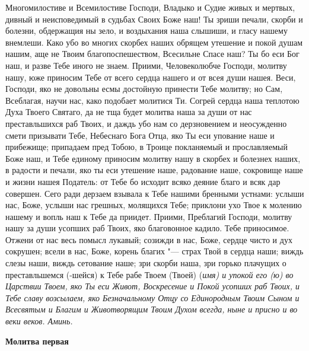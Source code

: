 Многомилостиве и Всемилостиве Господи, Владыко и Судие живых и мертвых, дивный и неисповедимый в судьбах Своих Боже наш! Ты зриши печали, скорби и болезни, обдержащия ны зело, и воздыхания наша слышиши, и гласу нашему внемлеши. Како убо во многих скорбех наших обрящем утешение и покой душам нашим, аще не Твоим благопоспешеством, Всесильне Спасе наш? Ты бо еси Бог наш, и разве Тебе иного не знаем. Приими, Человеколюбче Господи, молитву нашу, юже приносим Тебе от всего сердца нашего и от всея души нашея. Веси, Господи, яко не довольны есмы достойную принести Тебе молитву; но Сам, Всеблагая, научи нас, како подобает молитися Ти. Согрей сердца наша теплотою Духа Твоего Святаго, да не тща будет молитва наша за души от нас преставльшихся раб Твоих, и даждь убо нам со дерзновением и неосужденно смети призывати Тебе, Небеснаго Бога Отца, яко Ты еси упование наше и прибежище; припадаем пред Тобою, в Троице покланяемый и прославляемый Боже наш, и Тебе единому приносим молитву нашу в скорбех и болезнех наших, в радости и печали, яко ты еси утешение наше, радование наше, сокровище наше и жизни нашея Податель: от Тебе бо исходит всяко деяние благо и всяк дар совершен. Сего ради дерзаем взывала к Тебе нашими бренными устнами: услыши нас, Боже, услыши нас грешных, молящихся Тебе; приклони ухо Твое к молению нашему и вопль наш к Тебе да приидет. Приими, Преблагий Господи, молитву нашу за души усопших раб Твоих, яко благовонное кадило. Тебе приносимое. Отжени от нас весь помысл лукавый; созижди в нас, Боже, сердце чисто и дух сокрушен; всели в нас, Боже, корень благих "--- страх Твой в сердца наши; виждь слезы наши, виждь сетование наше; зри скорби наша, зри горько плачущих о преставльшемся (-шейся) к Тебе рабе Твоем (Твоей) (\itshape имя\normalfont{}) и упокой его (ю) во Царствии Твоем, яко Ты еси Живот, Воскресение и Покой усопших раб Твоих, и Тебе славу возсылаем, яко Безначальному Отцу со Единородным Твоим Сыном и Всесвятым и Благим и Животворящим Твоим Духом всегда, ныне и присно и во веки веков. Аминь. 


\mychapterending

 


\bfseries Молитва первая\normalfont{}


